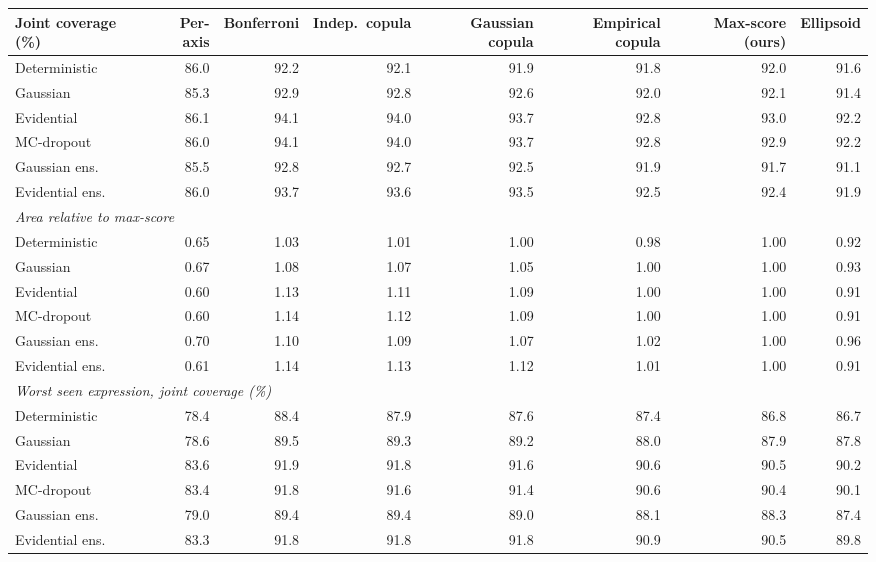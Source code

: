 \begin{tabular}{lrrrrrrr}
\toprule
Joint coverage (\%) & Per-axis & Bonferroni & Indep.\ copula & Gaussian copula & Empirical copula & Max-score (ours) & Ellipsoid \\
\midrule
Deterministic & 86.0 & 92.2 & 92.1 & 91.9 & 91.8 & 92.0 & 91.6 \\
Gaussian & 85.3 & 92.9 & 92.8 & 92.6 & 92.0 & 92.1 & 91.4 \\
Evidential & 86.1 & 94.1 & 94.0 & 93.7 & 92.8 & 93.0 & 92.2 \\
MC-dropout & 86.0 & 94.1 & 94.0 & 93.7 & 92.8 & 92.9 & 92.2 \\
Gaussian ens. & 85.5 & 92.8 & 92.7 & 92.5 & 91.9 & 91.7 & 91.1 \\
Evidential ens. & 86.0 & 93.7 & 93.6 & 93.5 & 92.5 & 92.4 & 91.9 \\
\midrule
\multicolumn{8}{l}{\emph{Area relative to max-score}} \\
Deterministic & 0.65 & 1.03 & 1.01 & 1.00 & 0.98 & 1.00 & 0.92 \\
Gaussian & 0.67 & 1.08 & 1.07 & 1.05 & 1.00 & 1.00 & 0.93 \\
Evidential & 0.60 & 1.13 & 1.11 & 1.09 & 1.00 & 1.00 & 0.91 \\
MC-dropout & 0.60 & 1.14 & 1.12 & 1.09 & 1.00 & 1.00 & 0.91 \\
Gaussian ens. & 0.70 & 1.10 & 1.09 & 1.07 & 1.02 & 1.00 & 0.96 \\
Evidential ens. & 0.61 & 1.14 & 1.13 & 1.12 & 1.01 & 1.00 & 0.91 \\
\midrule
\multicolumn{8}{l}{\emph{Worst seen expression, joint coverage (\%)}} \\
Deterministic & 78.4 & 88.4 & 87.9 & 87.6 & 87.4 & 86.8 & 86.7 \\
Gaussian & 78.6 & 89.5 & 89.3 & 89.2 & 88.0 & 87.9 & 87.8 \\
Evidential & 83.6 & 91.9 & 91.8 & 91.6 & 90.6 & 90.5 & 90.2 \\
MC-dropout & 83.4 & 91.8 & 91.6 & 91.4 & 90.6 & 90.4 & 90.1 \\
Gaussian ens. & 79.0 & 89.4 & 89.4 & 89.0 & 88.1 & 88.3 & 87.4 \\
Evidential ens. & 83.3 & 91.8 & 91.8 & 91.8 & 90.9 & 90.5 & 89.8 \\
\bottomrule
\end{tabular}
